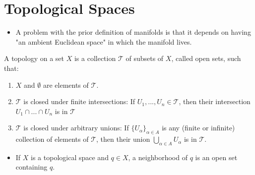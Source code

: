\documentclass{article}
\begin{document}
\section{Topological Spaces}
\begin{itemize}
    \item A problem with the prior definition of manifolds is that it depends on having "an ambient Euclidean space" in which the manifold lives.
\end{itemize}
A topology on a set $X$ is a collection $\mathcal{T}$ of subsets of $X$, called open sets, such that:
\begin{enumerate}
    \item $X$ and $\emptyset$ are elements of $\mathcal{T}$.
    \item $\mathcal{T}$ is closed under finite intersections: If $U_1,...,U_n\in \mathcal{T}$, then their intersection $U_1\cap...\cap U_n$ is in $\mathcal{T}$
    \item $\mathcal{T}$ is closed under arbitrary unions: If $\{U_\alpha\}_{\alpha\in A}$ is any (finite or infinite) collection of elements of $\mathcal{T}$, then their union $\bigcup_{\alpha\in A}U_\alpha$ is in $\mathcal{T}$.
 \end{enumerate}
 \begin{itemize}
     \item If $X$ is a topological space and $q\in X$, a neighborhood of $q$ is an open set containing $q$.
 \end{itemize}
\end{document}
